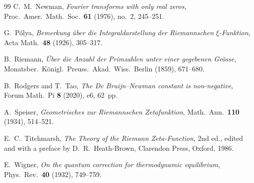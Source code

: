 \documentclass[11pt,reqno]{amsart}
\theoremstyle{definition}
\theoremstyle{remark}
\numberwithin{equation}{section}
\begin{document}
\begin{thebibliography}{99}
C.~M.~Newman, \emph{Fourier transforms with only real zeros}, Proc.\ Amer.\ Math.\ Soc.\ \textbf{61} (1976), no.~2, 245--251.

G.~P\'{o}lya, \emph{Bemerkung \"{u}ber die Integraldarstellung der Riemannschen $\xi$-Funktion}, Acta Math.\ \textbf{48} (1926), 305--317.

B.~Riemann, \emph{\"{U}ber die Anzahl der Primzahlen unter einer gegebenen Gr\"{o}sse}, Monatsber.\ K\"{o}nigl.\ Preuss.\ Akad.\ Wiss.\ Berlin (1859), 671--680.

B.~Rodgers and T.~Tao, \emph{The De Bruijn--Newman constant is non-negative}, Forum Math.\ Pi \textbf{8} (2020), e6, 62~pp.

A.~Speiser, \emph{Geometrisches zur Riemannschen Zetafunktion}, Math.\ Ann.\ \textbf{110} (1934), 514--521.

E.~C.~Titchmarsh, \emph{The Theory of the Riemann Zeta-Function}, 2nd ed., edited and with a preface by D.~R.~Heath-Brown, Clarendon Press, Oxford, 1986.

E.~Wigner, \emph{On the quantum correction for thermodynamic equilibrium}, Phys.\ Rev.\ \textbf{40} (1932), 749--759.

\end{thebibliography}
\end{document}
